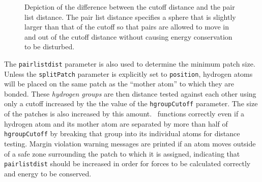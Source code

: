 \begin{figure}[htb]
  \caption[Example of cutoff and pairlist distance uses]
  {{\small Depiction of the difference between the cutoff distance and the
  pair list distance.  The pair list distance specifies a sphere that is
  slightly larger than that of the cutoff so that pairs are allowed to
  move in and out of the cutoff distance without causing energy conservation
  to be disturbed.}}
  \label{fig:pairlistdist}
\end{figure}

The {\tt pairlistdist} parameter is also used to determine the minimum patch size.
Unless the {\tt splitPatch} parameter is explicitly set to {\tt position}, hydrogen atoms will be placed on the same patch as the ``mother atom'' to which they are bonded.
These {\em hydrogen groups} are then distance tested against each other using only a cutoff increased by the the value of the {\tt hgroupCutoff} parameter.
The size of the patches is also increased by this amount.
\NAMD\ functions correctly even if a hydrogen atom and its mother atom are separated by more than half of {\tt hgroupCutoff} by breaking that group into its individual atoms for distance testing.
Margin violation warning messages are printed if an atom moves outside of a safe zone surrounding the patch to which it is assigned, indicating that {\tt pairlistdist} should be increased in order for forces to be calculated correctly and energy to be conserved.

